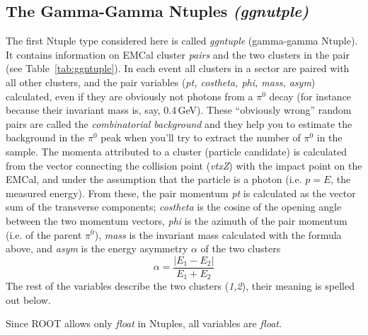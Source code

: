 \documentclass[pdftex,12pt,letter]{article}
\newcommand{\piz}{\mbox{$\pi^0$}\xspace}
\newcommand{\gev}{\mbox{GeV}\xspace}
\begin{document}
\subsection{The Gamma-Gamma Ntuples \it{(ggnutple)}}
The first Ntuple type considered here is called {\it ggntuple} (gamma-gamma Ntuple).
It contains information on EMCal cluster {\it pairs} and the two clusters
in the pair (see Table~\ref{tab:ggntuple}).  In each event all
clusters in a sector are paired with all other clusters, and the pair
variables ({\it pt, costheta, phi, mass, asym}) calculated, even if
they are obviously not photons from a \piz decay (for instance because
their invariant mass is, say, 0.4\,\gev).  These ``obviously wrong''
random pairs are called the {\it combinatorial background} and they
help you to estimate the background in the \piz peak when you'll try
to extract the number of \piz in the sample.
The momenta attributed to a cluster (particle candidate) is calculated
from the vector connecting the collision point ({\it vtxZ}) with the
impact point on the EMCal, and under the assumption that the particle
is a photon (i.e. $p=E$, the measured energy).  From these, the pair
momentum {\it pt} is calculated as the vector sum of the transverse
components; {\it costheta} is the cosine of the opening angle between
the two momentum vectors, {\it phi} is the azimuth of the pair
momentum (i.e. of the parent \piz), {\it mass} is the invariant mass
calculated with the formula above, and {\it asym} is the energy
asymmetry $\alpha$ of the two clusters
$$\alpha = \frac{|E_1-E_2|}{E_1+E_2}$$
The rest of the variables describe the two clusters ({\it 1,2}), their
meaning is spelled out below.

Since ROOT allows only {\it float} in Ntuples, all variables are {\it float}. 
\end{document}
